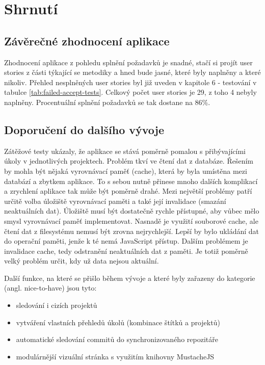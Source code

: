 \chapter{Shrnutí}

\section{Závěrečné zhodnocení aplikace}

Zhodnocení aplikace z pohledu splnění požadavků je snadné, stačí si projít user stories z části týkající se metodiky a hned bude jasné, které byly naplněny a které nikoliv. Přehled nesplněných user stories byl již uveden v kapitole 6 - testování v tabulce \ref{tab:failed-accept-tests}. Celkový počet user stories je 29, z toho 4 nebyly naplněny. Procentuální splnění požadavků se tak dostane na 86\%. 

\section{Doporučení do dalšího vývoje}

Zátěžové testy ukázaly, že aplikace se stává poměrně pomalou s přibývajícími úkoly v jednotlivých projektech. Problém tkví ve čtení dat z databáze. Řešením by mohla být nějaká vyrovnávací paměť (cache), která by byla umístěna mezi databází a zbytkem aplikace. To s sebou nutně přinese mnoho dalších komplikací a zrychlení aplikace tak může být poměrně drahé. Mezi největší problémy patří určitě volba úložiště vyrovnávací paměti a také její invalidace (smazání neaktuálních dat). Úložiště musí být dostatečně rychle přístupné, aby vůbec mělo smysl vyrovnávací paměť implementovat. Nasnadě je využití souborové cache, ale čtení dat z filesystému nemusí být zrovna nejrychlejší. Lepší by bylo ukládání dat do operační paměti, jenže k té nemá JavaScript přístup. Dalším problémem je invalidace cache, tedy odstranění neaktuálních dat z paměti. Je totiž poměrně velký problém určit, kdy už data nejsou aktuální.

Další funkce, na které se přišlo během vývoje a které byly zařazeny do kategorie  (angl. nice-to-have) jsou tyto:

\begin{itemize}
\item sledování i cizích projektů
\item vytváření vlastních přehledů úkolů (kombinace štítků a projektů)
\item automatické sledování commitů do synchronizovaného repozitáře
\item modulárnější vizuální stránka s využitím knihovny MustacheJS\cite{mustache}
\end{itemize}

